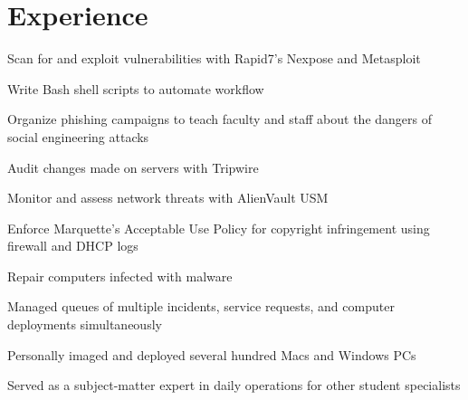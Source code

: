 \documentclass[letterpaper]{deedy-resume} %
\begin{document}
\begin{minipage}[t]{0.66\textwidth} %


\section{Experience}


\vspace{\topsep} %
\begin{tightitemize}
\item Scan for and exploit vulnerabilities with Rapid7’s Nexpose and Metasploit
\item Write Bash shell scripts to automate workflow
\item Organize phishing campaigns to teach faculty and staff about the dangers of social engineering attacks
\item Audit changes made on servers with Tripwire
\item Monitor and assess network threats with AlienVault USM
\item Enforce Marquette’s Acceptable Use Policy for copyright infringement using firewall and DHCP logs
\item Repair computers infected with malware
\end{tightitemize}

\sectionspace %


\begin{tightitemize}
\item Managed queues of multiple incidents, service requests, and computer deployments simultaneously
\item Personally imaged and deployed several hundred Macs and Windows PCs
\item Served as a subject-matter expert in daily operations for other student specialists
\end{tightitemize}


\end{minipage}
\end{document}
